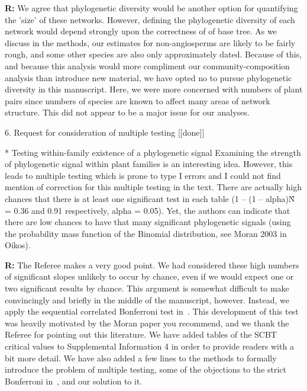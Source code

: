 \documentclass[12pt]{letter}
\newenvironment{refquote}{\bigskip \begin{it}}{\end{it}\smallskip}
\begin{document}
		\textbf{R:} We agree that phylogenetic diversity would be another option for quantifying the 'size' of these networks. However, defining the phylogenetic diversity of each network would depend strongly upon the correctness of of base tree. As we discuss in the methods, our estimates for non-angiosperms are likely to be fairly rough, and some other species are also only approximately dated. Because of this, and because this analysis would more compliment our community-composition analysis than introduce new material, we have opted no to pursue phylogenetic diversity in this manuscript. Here, we were more concerned with numbers of plant pairs since numbers of species are known to affect many areas of network structure. This did not appear to be a major issue for our analyses.


	6. Request for consideration of multiple testing [[done]]

		\begin{refquote}
			* Testing within-family existence of a phylogenetic signal
			Examining the strength of phylogenetic signal within plant families is an interesting idea. However, this leads to multiple testing which is prone to type I errors and I could not find mention of correction for this multiple testing in the text. There are actually high chances that there is at least one significant test in each table (1 – (1 – alpha)\^N = 0.36 and 0.91 respectively, alpha = 0.05). Yet, the authors can indicate that there are low chances to have that many significant phylogenetic signals (using the probability mass function of the Binomial distribution, see Moran 2003 in Oikos).
		\end{refquote}


		\textbf{R:} The Referee makes a very good point. We had considered these high numbers of significant slopes unlikely to occur by chance, even if we would expect one or two significant results by chance. This argument is somewhat difficult to make convincingly and briefly in the middle of the manuscript, however. Instead, we apply the sequential correlated Bonferroni test in~\citet{Drezner2016}. This development of this test was heavily motivated by the Moran paper you recommend, and we thank the Referee for pointing out this literature. We have added tables of the SCBT critical values to Supplemental Information 4 in order to provide readers with a bit more detail. We have also added a few lines to the methods to formally introduce the problem of multiple testing, some of the objections to the strict Bonferroni in~\citet{Moran2003}, and our solution to it.
\end{document}
